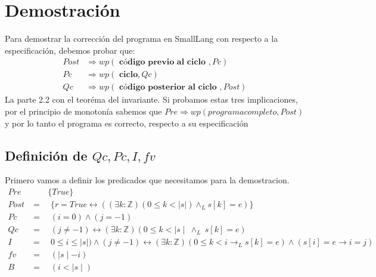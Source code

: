 \documentclass[12pt]{book}
\begin{document}
\chapter{Demostraci\'on}
\begin{shaded}
Para demostrar la corrección del programa en SmallLang con respecto a la especificación, debemos probar que:
\begin{align}
Post &\Rightarrow wp( \textbf{ c\'odigo previo al ciclo } , Pc) \\
Pc &\Rightarrow wp (\textbf{ ciclo}, Qc ) \\
Qc & \Rightarrow wp ( \textbf{ c\'odigo posterior al ciclo }, Post) 
\end{align}
La parte 2.2 con el teor\'ema del invariante. Si probamos estas tres implicaciones, por el principio de monoton\'ia sabemos que  $ Pre \Rightarrow wp(  programa completo  , Post)  $  y por lo tanto el programa  es correcto, respecto a su especificaci\'on
\end{shaded}

\section{Definici\'on de $ Qc, Pc, I, fv$}
Primero vamos a definir los predicados que necesitamos para la demostracion.
\begin{align*}
Pre & \quad \quad \{ True \}  \\
Post &= \quad \{ r = True \leftrightarrow ((\exists k :\mathbb{Z})(0 \leq k < |s|) \wedge_L s[k] = e)\} \\
Pc &= \quad (i = 0) \wedge (j = -1) \\
Qc &=  \quad(j \neq -1) \leftrightarrow (\exists k : \mathbb{Z})(0 \leq k < \mid s\mid \ \wedge_{L} \ s[k] = e) \\
I &= \quad 0 \leq i \leq  \mid s \mid) \wedge (j \neq -1) \leftrightarrow (\exists k : \mathbb{Z})(0 \leq k < i \rightarrow_L s[k] = e) \wedge (s[i] = e \rightarrow i = j)  \\
fv &= \quad ( \mid s \mid - i )\\
B &= \quad (i < \mid s \mid)
\end{align*}
\end{document}
